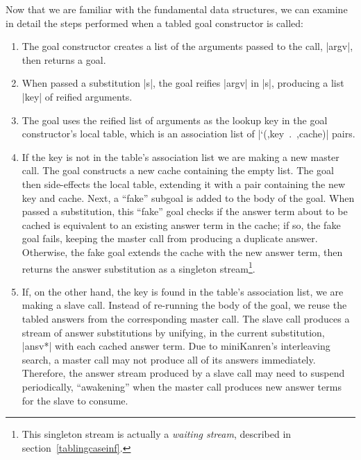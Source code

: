Now that we are familiar with the fundamental data structures, we can
examine in detail the steps performed when a tabled goal constructor
is called:


\begin{enumerate}
\item The goal constructor creates a list of the arguments
  passed to the call, \scheme|argv|, then returns a goal.
\item When passed a substitution \scheme|s|, the goal reifies
  \scheme|argv| in \scheme|s|, producing a list \scheme|key| of
  reified arguments.


\item The goal uses the reified list of arguments as the lookup key in
  the goal constructor's local table, which is an association list of
  \mbox{\scheme|`(,key . ,cache)|} pairs.
\item If the key is not in the table's association list we are making
  a new master call.  The goal constructs a new cache
  containing the empty list.  The goal then side-effects the local
  table, extending it with a pair containing the new key and cache.
  Next, a ``fake'' subgoal is added to the body of the goal.
  When passed a substitution, this ``fake'' goal checks if the answer
  term about to be cached is equivalent to an existing answer term in the
  cache; if so, the fake goal fails, keeping the master call from
  producing a duplicate answer.  Otherwise, the fake goal extends the
  cache with the new answer term, then returns the answer substitution
  as a singleton stream\footnote{This singleton stream is actually a
    \emph{waiting stream}, described in
    section~\ref{tablingcaseinf}.}.
\item If, on the other hand, the key is found in the table's
  association list, we are making a slave call.  Instead of re-running
  the body of the goal, we reuse the tabled answers from the
  corresponding master call.  The slave call produces a stream of
  answer substitutions by unifying, in the current substitution,
  \scheme|ansv*| with each cached answer term.  Due to miniKanren's
  interleaving search, a master call may not produce all of its
  answers immediately.  Therefore, the answer stream produced by a
  slave call may need to suspend periodically, ``awakening'' when the
  master call produces new answer terms for the slave to consume.
\end{enumerate}

